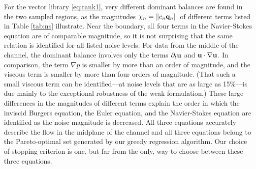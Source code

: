 \documentclass[preprint]{article}
\def\bi#1{\textbf{#1}}
\begin{document}
For the vector library \eqref{eq:rank1}, very different dominant balances are found in the two sampled regions, as the magnitudes $\chi_n=\|c_n{\bf q}_n\|$ of different terms listed in Table \ref{tab:ns} illustrate. Near the boundary, all four terms in the Navier-Stokes equation are of comparable magnitude, so it is not surprising that the same relation is identified for all listed noise levels. For data from the middle of the channel, the dominant balance involves only the terms $\partial_t{\bf u}$ and ${\bf u}\cdot\nabla{\bf u}$. In comparison, the term $\nabla p$ is smaller by more than an order of magnitude, and the viscous term is smaller by more than four orders of magnitude. (That such a small viscous term can be identified---at noise levels that are as large as 15\%---is due mainly to the exceptional robustness of the weak formulation.) These large differences in the magnitudes of different terms explain the order in which the inviscid Burgers equation, the Euler equation, and the Navier-Stokes equation are identified as the noise magnitude is decreased. All three equations accurately describe the flow in the midplane of the channel and all three equations belong to the Pareto-optimal set generated by our greedy regression algorithm. Our choice of stopping criterion is one, but far from the only, way to choose between these three equations.

\end{document}
